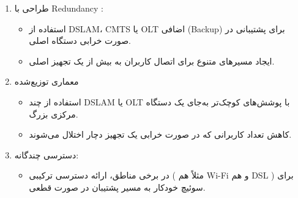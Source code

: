 {\begin{enumerate}
	\item طراحی با Redundancy :
	\begin{itemize}
		\item استفاده از DSLAM، CMTS یا OLT اضافی (Backup) برای پشتیبانی در صورت خرابی دستگاه اصلی.
		\item ایجاد مسیرهای متنوع برای اتصال کاربران به بیش از یک تجهیز اصلی.
	\end{itemize}
	\item معماری توزیع‌شده
	\begin{itemize}
		\item استفاده از چند DSLAM یا OLT با پوشش‌های کوچک‌تر به‌جای یک دستگاه مرکزی بزرگ.
		\item کاهش تعداد کاربرانی که در صورت خرابی یک تجهیز دچار اختلال می‌شوند.
	\end{itemize}
	\item دسترسی چندگانه:
	\begin{itemize}
		\item در برخی مناطق، ارائه دسترسی ترکیبی ( مثلاً هم Wi-Fi و هم DSL ) برای سوئیچ خودکار به مسیر پشتیبان در صورت قطعی.
	\end{itemize}
\end{enumerate}


}


